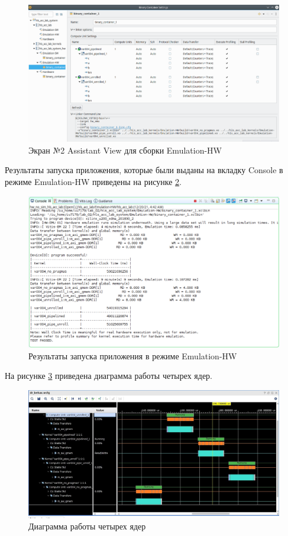 \documentclass[12pt]{report}
\begin{document}
\begin{figure}[h!p]
	\centering
	\includegraphics[width = \linewidth]{aview_2.png}
	\caption{Экран №2 Assistant View для сборки Emulation-HW}
	\label{img:aview_2}
\end{figure}

Результаты запуска приложения, которые были выданы на вкладку Console в режиме Emulation-HW приведены на рисунке \ref{img:test_hw_em}.
\begin{figure}[h!p]
	\centering
	\includegraphics[width = \linewidth]{test_hw_em.png}
	\caption{Результаты запуска приложения в режиме Emulation-HW}
	\label{img:test_hw_em}
\end{figure}
\newpage
На рисунке \ref{img:dia} приведена диаграмма работы четырех ядер.
\begin{figure}[h!p]
	\centering
	\includegraphics[width = \linewidth]{dia.png}
	\caption{Диаграмма работы четырех ядер}
	\label{img:dia}
\end{figure}
\end{document}
